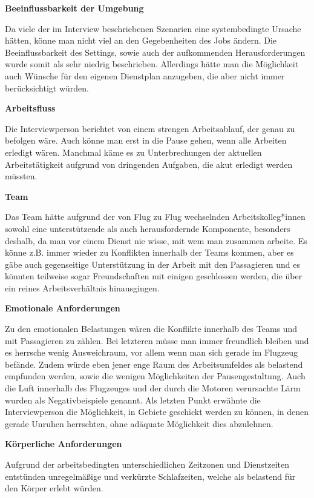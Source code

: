 \documentclass[12pt, a4paper]{article}
\begin{document}
\textbf{Beeinflussbarkeit der Umgebung}

Da viele der im Interview beschriebenen Szenarien eine systembedingte Ursache hätten, könne man nicht viel an den Gegebenheiten des Jobs ändern.
Die Beeinflussbarkeit des Settings, sowie auch der aufkommenden Herausforderungen wurde somit als sehr niedrig beschrieben. 
Allerdings hätte man die Möglichkeit auch Wünsche für den eigenen Dienstplan anzugeben, die aber nicht immer berücksichtigt würden.

\textbf{Arbeitsfluss}

Die Interviewperson berichtet von einem strengen Arbeitsablauf, der genau zu befolgen wäre.
Auch könne man erst in die Pause gehen, wenn alle Arbeiten erledigt wären. 
Manchmal käme es zu Unterbrechungen der aktuellen Arbeitstätigkeit aufgrund von dringenden Aufgaben, die akut erledigt werden müssten.

\textbf{Team}

Das Team hätte aufgrund der von Flug zu Flug wechselnden Arbeitskolleg*innen sowohl eine unterstützende als auch herausfordernde Komponente, 
besonders deshalb, da man vor einem Dienst nie wisse, mit wem man zusammen arbeite.
Es könne z.B. immer wieder zu Konflikten innerhalb der Teams kommen, aber es gäbe auch gegenseitige 
Unterstützung in der Arbeit mit den Passagieren und es könnten teilweise sogar Freundschaften mit einigen geschlossen werden, die über ein reines Arbeitsverhältnis hinausgingen.

\textbf{Emotionale Anforderungen}

Zu den emotionalen Belastungen wären die Konflikte innerhalb des Teams und mit Passagieren zu zählen.
Bei letzteren müsse man immer freundlich bleiben und es herrsche wenig Ausweichraum, vor allem wenn man sich gerade im Flugzeug befände.
Zudem würde eben jener enge Raum des Arbeitsumfeldes als belastend empfunden werden, sowie die wenigen Möglichkeiten der Pausengestaltung. 
Auch die Luft innerhalb des Flugzeuges und der durch die Motoren verursachte Lärm wurden als Negativbeispiele genannt. 
Als letzten Punkt erwähnte die Interviewperson die Möglichkeit, in Gebiete geschickt werden zu können, 
in denen gerade Unruhen herrschten, ohne adäquate Möglichkeit dies abzulehnen.

\textbf{Körperliche Anforderungen}

Aufgrund der arbeitsbedingten unterschiedlichen Zeitzonen und Dienstzeiten entstünden unregelmäßige und verkürzte Schlafzeiten,
welche als belastend für den Körper erlebt würden.
\end{document}
